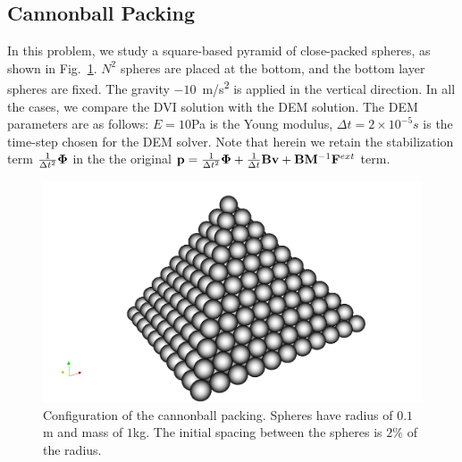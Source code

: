 \subsection{Cannonball Packing}
In this problem, we study a square-based pyramid of close-packed spheres, as shown in Fig.~\ref{fig:cannonball}. $N^2$ spheres are placed at the bottom, and the bottom layer spheres are fixed. The gravity $-10$~\si{m/s^2} is applied in the vertical direction. In all the cases, we compare the DVI solution with the DEM solution. The DEM parameters are as follows: $E=10$\si{Pa} is the Young modulus, $\Delta t=2\times10^{-5}\si{s}$ is the time-step chosen for the DEM solver.
Note that herein we retain the stabilization term  $\frac{1}{\Delta t^2}{\bf \Phi} $ in the the original ${\bf p} = \frac{1}{\Delta t^2}{\bf \Phi} + \frac{1}{\Delta t}{\bf B} {\bf v} + {\bf B}{\bf M}^{-1}{\bf F}^{ext}$ term.\\
\begin{figure}[H]
	\begin{center}
		\includegraphics[width=1.\textwidth]{images/CD/Cannonball.png}
	\end{center}
	\caption{Configuration of the cannonball packing. Spheres have radius of $0.1$\si{m} and mass of $1$\si{kg}. The initial spacing between the spheres is $2\%$ of the radius.  }\label{fig:cannonball}
\end{figure}
